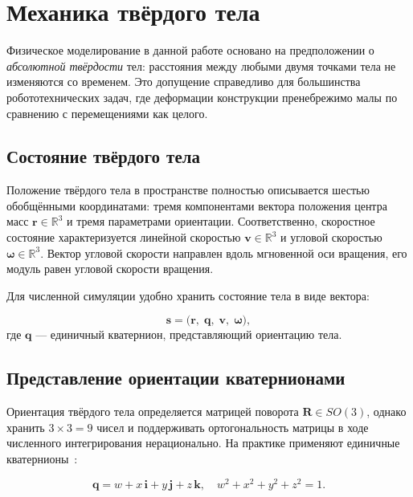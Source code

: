 \section{Механика твёрдого тела}

Физическое моделирование в данной работе основано на предположении о \emph{абсолютной твёрдости} тел: 
расстояния между любыми двумя точками тела не изменяются со временем. Это допущение справедливо для 
большинства робототехнических задач, где деформации конструкции пренебрежимо малы по сравнению с перемещениями 
как целого.

\subsection{Состояние твёрдого тела}

Положение твёрдого тела в пространстве полностью описывается шестью обобщёнными координатами: тремя 
компонентами вектора положения центра масс $\mathbf{r} \in \mathbb{R}^3$ и тремя параметрами ориентации. 
Соответственно, скоростное состояние характеризуется линейной скоростью $\mathbf{v} \in \mathbb{R}^3$ и 
угловой скоростью $\boldsymbol{\omega} \in \mathbb{R}^3$. Вектор угловой скорости направлен вдоль мгновенной 
оси вращения, его модуль равен угловой скорости вращения.

Для численной симуляции удобно хранить состояние тела в виде вектора:

\begin{equation}
  \mathbf{s} = \bigl(\mathbf{r},\; \mathbf{q},\; \mathbf{v},\; \boldsymbol{\omega}\bigr),
  \label{eq:rigid-state}
\end{equation}
где $\mathbf{q}$ --- единичный кватернион, представляющий ориентацию тела.

\subsection{Представление ориентации кватернионами}

Ориентация твёрдого тела определяется матрицей поворота $\mathbf{R} \in SO(3)$, однако хранить $3 \times 3 = 
9$ чисел и поддерживать ортогональность матрицы в ходе численного интегрирования нерационально. На практике 
применяют единичные кватернионы~\cite{diebel2006representing}:

\begin{equation}
  \mathbf{q} = w + x\,\mathbf{i} + y\,\mathbf{j} + z\,\mathbf{k}, \quad w^2 + x^2 + y^2 + z^2 = 1.
\end{equation}

